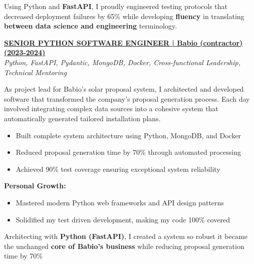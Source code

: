 \documentclass[a4paper,10pt]{article}
\begin{document}
{\begin{minipage}{\dimexpr\textwidth-2\fboxsep\relax}
		\vspace{0.2cm}

        Using Python and \textbf{FastAPI}, I proudly engineered testing protocols that decreased
        deployment failures by 65\% while developing \textbf{fluency} in translating
        \textbf{between data science and engineering} terminology.

		\vspace{0.4cm}

        \noindent\uline{\textbf{SENIOR PYTHON SOFTWARE ENGINEER | Babio (contractor) (2023-2024)}} \\
		\vspace{0.1cm}
		{\small\textit{Python, FastAPI, Pydantic, MongoDB, Docker, Cross-functional Leadership, Technical Mentoring}}
		\vspace{0.2cm}

		As project lead for Babio's solar proposal system, I architected and developed software that transformed the company's proposal generation process. Each day involved integrating complex data sources into a cohesive system that automatically generated tailored installation plans.

		\vspace{0.2cm}
		\begin{itemize}[label=\textcolor{darkblue}{\textbullet}, leftmargin=*, nosep]
			\item Built complete system architecture using Python, MongoDB, and Docker
			\item Reduced proposal generation time by 70\% through automated processing
			\item Achieved 90\% test coverage ensuring exceptional system reliability
		\end{itemize}

		\vspace{0.2cm}
		\textbf{Personal Growth:}
		\vspace{0.2cm}
		\begin{itemize}[label=\textcolor{darkblue}{\textbullet}, leftmargin=*, nosep]
			\item Mastered modern Python web frameworks and API design patterns
			\item Solidified my test driven development, making my code 100\% covered
		\end{itemize}

		\vspace{0.4cm}

        Architecting with \textbf{Python (FastAPI)}, I created a system so robust it became the
        unchanged \textbf{core of Babio's business} while reducing proposal generation time by
        70\%


\end{minipage}}
\end{document}

